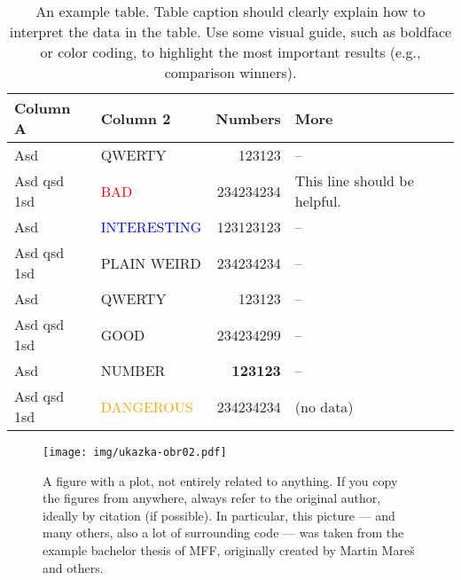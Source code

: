 \begin{table}
\centering\footnotesize\sf
\begin{tabular}{llrl}
\toprule
Column A & Column 2 & Numbers & More \\
\midrule
Asd & QWERTY & 123123 & -- \\
Asd qsd 1sd & \textcolor{red}{BAD} & 234234234 & This line should be helpful. \\
Asd & \textcolor{blue}{INTERESTING} & 123123123 & -- \\
Asd qsd 1sd & \textcolor{violet!50}{PLAIN WEIRD} & 234234234 & -- \\
Asd & QWERTY & 123123 & -- \\
\addlinespace %
Asd qsd 1sd & \textcolor{green!80!black}{GOOD} & 234234299 & -- \\
Asd & NUMBER & \textbf{123123} & -- \\
Asd qsd 1sd & \textcolor{orange}{DANGEROUS} & 234234234 & (no data) \\
\bottomrule
\end{tabular}
\caption{An example table.  Table caption should clearly explain how to interpret the data in the table. Use some visual guide, such as boldface or color coding, to highlight the most important results (e.g., comparison winners).}
\label{tab:z}
\end{table}

\begin{figure}
\centering
\texttt{[image: img/ukazka-obr02.pdf]}
\caption{A figure with a plot, not entirely related to anything. If you copy the figures from anywhere, always refer to the original author, ideally by citation (if possible). In particular, this picture --- and many others, also a lot of surrounding code --- was taken from the example bachelor thesis of MFF, originally created by Martin Mareš and others.}
\label{fig:g}
\end{figure}

